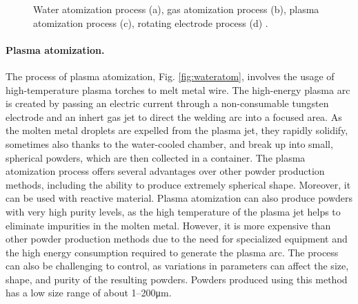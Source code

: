 \begin{figure}
{    }
    \qquad
    \caption[Atomization processes]{Water atomization process (a), gas atomization process (b), plasma atomization process (c), rotating electrode process (d) \cite{material_technology_innovations_co_rotating_nodate, material_technology_innovations_co_water_nodate, material_technology_innovations_co_gas_nodate, inovar_communications_ltd_metal_2020}.}
    \label{fig:atom}
\end{figure}
\paragraph{Plasma atomization.} The process of plasma atomization, Fig. \ref{fig:wateratom}, involves the usage of high-temperature plasma torches to melt metal wire. The high-energy plasma arc is created by passing an electric current through a non-consumable tungsten electrode and an inhert gas jet to direct the welding arc into a focused area. As the molten metal droplets are expelled from the plasma jet, they rapidly solidify, sometimes also thanks to the water-cooled chamber, and break up into small, spherical powders, which are then collected in a container. The plasma atomization process offers several advantages over other powder production methods, including the ability to produce extremely spherical shape. Moreover, it can be used with reactive material. Plasma atomization can also produce powders with very high purity levels, as the high temperature of the plasma jet helps to eliminate impurities in the molten metal. However, it is more expensive than other powder production methods due to the need for specialized equipment and the high energy consumption required to generate the plasma arc. The process can also be challenging to control, as variations in parameters can affect the size, shape, and purity of the resulting powders. Powders produced using this method has a low size range of about \numrange[range-phrase = --]{1}{200}\unit{\micro\metre}.
